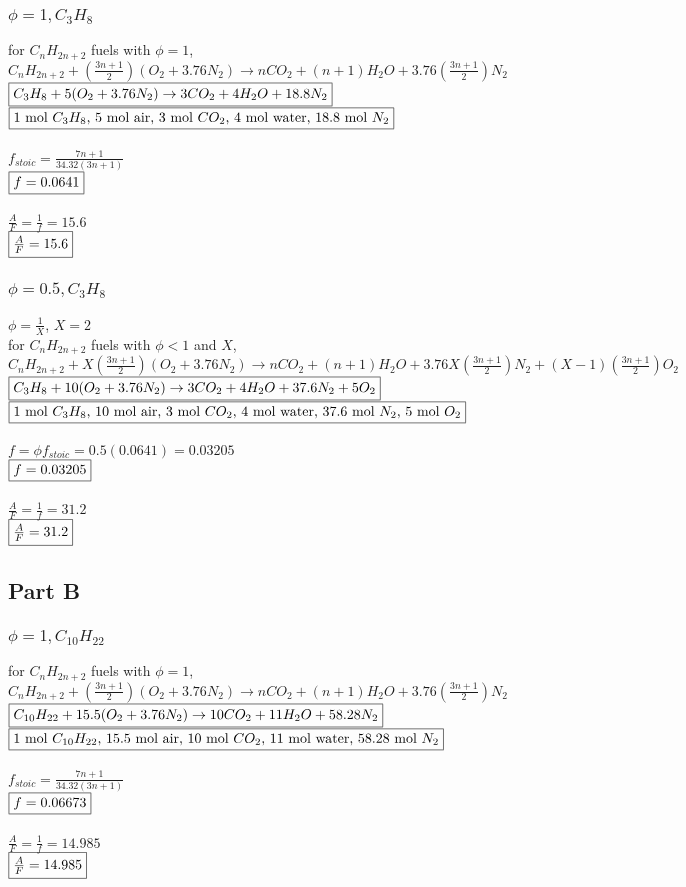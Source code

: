 \documentclass{article}
\begin{document}
\subsubsection*{$\phi=1, C_3H_8$}
for $C_nH_{2n+2}$ fuels with $\phi=1$, \\
$C_nH_{2n+2}+(\frac{3n+1}{2})(O_2+3.76N_2) \rightarrow nCO_2 + (n+1)H_2O +3.76(\frac{3n+1}{2})N_2$ \\
$\fbox{$C_3H_8+5(O_2+3.76N_2)\rightarrow 3CO_2+4H_2O+18.8N_2$}$ \\
$\fbox{1 mol $C_3H_8$, 5 mol air, 3 mol $CO_2$, 4 mol water, 18.8 mol $N_2$}$\\\\
$f_{stoic}=\frac{7n+1}{34.32(3n+1)}$ \\
$\fbox{$f=0.0641$}$ \\\\
$\frac{A}{F}=\frac{1}{f}=15.6$ \\
$\fbox{$\frac{A}{F}=15.6$}$

\subsubsection*{$\phi=0.5, C_3H_8$}
$\phi=\frac{1}{X}$, $X=2$ \\
for $C_nH_{2n+2}$ fuels with $\phi<1$ and $X$, \\
$C_nH_{2n+2}+X(\frac{3n+1}{2})(O_2+3.76N_2) \rightarrow nCO_2 + (n+1)H_2O +3.76X(\frac{3n+1}{2})N_2 +
(X-1)(\frac{3n+1}{2})O_2$ \\
$\fbox{$C_3H_8+10(O_2+3.76N_2)\rightarrow 3CO_2+4H_2O+37.6N_2+5O_2$}$ \\
$\fbox{1 mol $C_3H_8$, 10 mol air, 3 mol $CO_2$, 4 mol water, 37.6 mol $N_2$, 5 mol $O_2$}$\\\\
$f=\phi f_{stoic}=0.5(0.0641)=0.03205$ \\
$\fbox{$f=0.03205$}$ \\\\
$\frac{A}{F}=\frac{1}{f}=31.2$ \\
$\fbox{$\frac{A}{F}=31.2$}$

\subsection*{Part B}
\subsubsection*{$\phi=1, C_{10}H_{22}$}
for $C_nH_{2n+2}$ fuels with $\phi=1$, \\
$C_nH_{2n+2}+(\frac{3n+1}{2})(O_2+3.76N_2) \rightarrow nCO_2 + (n+1)H_2O +3.76(\frac{3n+1}{2})N_2$ \\
$\fbox{$C_{10}H_{22}+15.5(O_2+3.76N_2) \rightarrow 10CO_2+11H_2O+58.28N_2$}$ \\
$\fbox{1 mol $C_{10}H_{22}$, 15.5 mol air, 10 mol $CO_2$, 11 mol water, 58.28 mol $N_2$}$\\\\
$f_{stoic}=\frac{7n+1}{34.32(3n+1)}$ \\
$\fbox{$f=0.06673$}$ \\\\
$\frac{A}{F}=\frac{1}{f}=14.985$ \\
$\fbox{$\frac{A}{F}=14.985$}$
\end{document}
